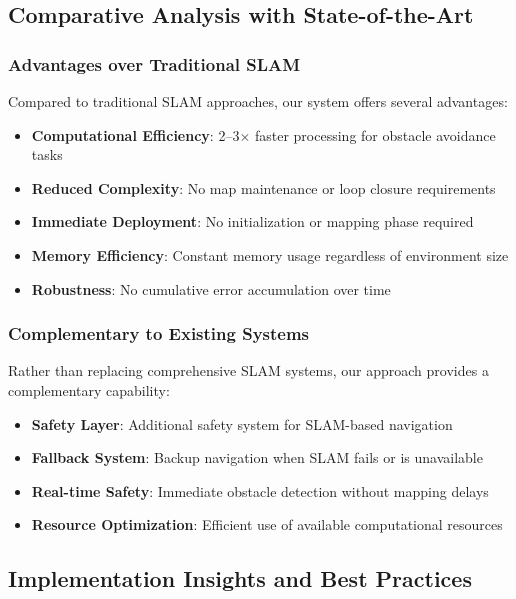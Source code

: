 \documentclass[12pt,oneside]{book}
\begin{document}
\subsection{Comparative Analysis with State-of-the-Art}

\subsubsection{Advantages over Traditional SLAM}

Compared to traditional SLAM approaches, our system offers several advantages:

\begin{itemize}
\item \textbf{Computational Efficiency}: 2--3$\times$ faster processing for obstacle avoidance tasks
\item \textbf{Reduced Complexity}: No map maintenance or loop closure requirements
\item \textbf{Immediate Deployment}: No initialization or mapping phase required
\item \textbf{Memory Efficiency}: Constant memory usage regardless of environment size
\item \textbf{Robustness}: No cumulative error accumulation over time
\end{itemize}

\subsubsection{Complementary to Existing Systems}

Rather than replacing comprehensive SLAM systems, our approach provides a complementary capability:

\begin{itemize}
\item \textbf{Safety Layer}: Additional safety system for SLAM-based navigation
\item \textbf{Fallback System}: Backup navigation when SLAM fails or is unavailable
\item \textbf{Real-time Safety}: Immediate obstacle detection without mapping delays
\item \textbf{Resource Optimization}: Efficient use of available computational resources
\end{itemize}

\subsection{Implementation Insights and Best Practices}
\end{document}
